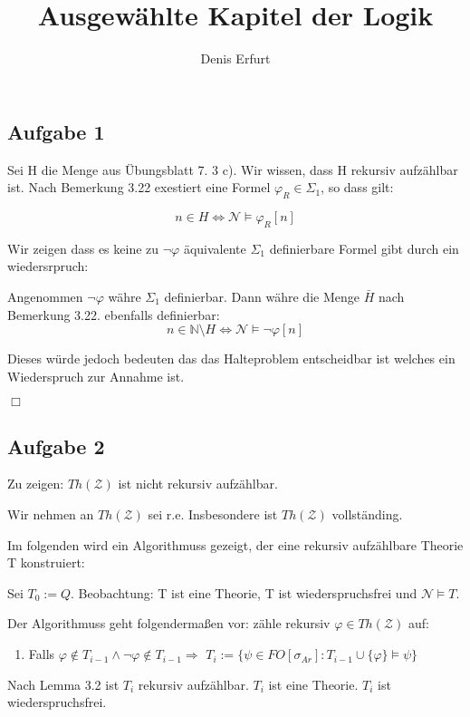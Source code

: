 \documentclass[12pt]{article}
\begin{document}
\title{Ausgewählte Kapitel der Logik}
\author{Denis Erfurt}
\maketitle



\subsection*{Aufgabe 1}
Sei H die Menge aus Übungsblatt 7. 3 c).
Wir wissen, dass H rekursiv aufzählbar ist. Nach Bemerkung 3.22 exestiert eine
Formel $\varphi_R\in\Sigma_1$, so dass gilt:

\begin{equation}
  n\in H \Leftrightarrow \mathcal{N}\models \varphi_R[n]
\end{equation}

Wir zeigen dass es keine zu $\neg\varphi$ äquivalente $\Sigma_1$ definierbare
Formel gibt durch ein wiedersrpruch:

Angenommen $\neg\varphi$ währe $\Sigma_1$ definierbar.
Dann währe die Menge $\bar H$ nach Bemerkung 3.22. ebenfalls definierbar:
\begin{equation}
  n\in \mathbb{N}\setminus H \Leftrightarrow \mathcal{N}\models\neg\varphi[n]
\end{equation}

Dieses würde jedoch bedeuten das das Halteproblem entscheidbar ist welches ein
Wiederspruch zur Annahme ist.

\begin{flushright} $\Box$ \end{flushright}


\subsection*{Aufgabe 2}
Zu zeigen: $Th(\mathcal{Z})$ ist nicht rekursiv aufzählbar.

Wir nehmen an $Th(\mathcal{Z})$ sei r.e.
Insbesondere ist $Th(\mathcal{Z})$ vollständing.

Im folgenden wird ein Algorithmuss gezeigt, der eine rekursiv aufzählbare
Theorie T konstruiert:

Sei $T_0:=Q$.
Beobachtung: T ist eine Theorie, T ist wiederspruchsfrei und $\mathcal{N}\models T$.

Der Algorithmuss geht folgendermaßen vor: zähle rekursiv $\varphi\in
Th(\mathcal{Z})$ auf:
\begin{enumerate}
  \item Falls $\varphi\notin T_{i-1} \land \neg\varphi\notin T_{i-1} \Rightarrow$
    $T_i:= \{\psi\in FO[\sigma_{Ar}]: T_{i-1}\cup\{\varphi\}\models\psi\}$
\end{enumerate}
Nach Lemma 3.2 ist $T_i$ rekursiv aufzählbar.
$T_i$ ist eine Theorie.
$T_i$ ist wiederspruchsfrei.
\end{document}
